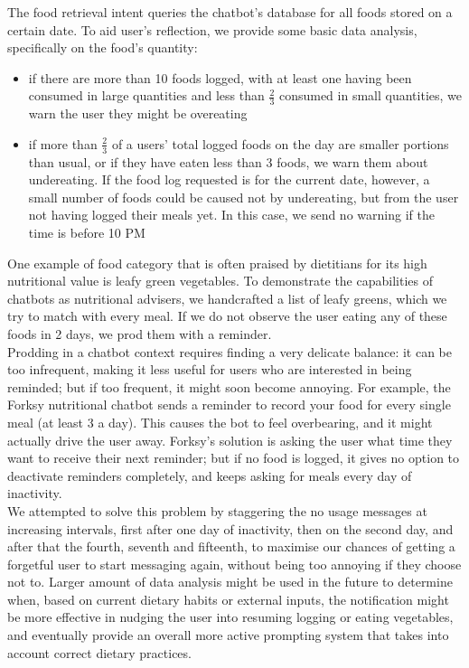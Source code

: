 The food retrieval intent queries the chatbot's database for all foods stored on a certain date. To aid user's reflection, we provide some basic data analysis, specifically on the food's quantity: 
\begin{itemize}
\item if there are more than 10 foods logged, with at least one having been consumed in large quantities and less than $\frac{2}{3}$ consumed in small quantities, we warn the user they might be overeating
\item if more than $\frac{2}{3}$ of a users' total logged foods on the day are smaller portions than usual, or if they have eaten less than 3 foods, we warn them about undereating. If the food log requested is for the current date, however, a small number of foods could be caused not by undereating, but from the user not having logged their meals yet. In this case, we send no warning if the time is before 10 PM
\end{itemize}

One example of food category that is often praised by dietitians for its high nutritional value \cite{bishoppgreens} is leafy green vegetables. To demonstrate the capabilities of chatbots as nutritional advisers, we handcrafted a list of leafy greens, which we try to match with every meal. If we do not observe the user eating any of these foods in 2 days, we prod them with a reminder. \\
Prodding in a chatbot context requires finding a very delicate balance: it can be too infrequent, making it less useful for users who are interested in being reminded; but if too frequent, it  might soon become annoying. For example, the Forksy nutritional chatbot \cite{forksywebsite} sends a reminder to record your food for every single meal (at least 3 a day). This causes the bot to feel overbearing, and it might actually drive the user away. Forksy's solution is asking the user what time they want to receive their next reminder; but if no food is logged, it gives no option to deactivate reminders completely, and keeps asking for meals every day of inactivity. \\
We attempted to solve this problem by staggering the no usage messages at increasing intervals, first after one day of inactivity, then on the second day, and after that the fourth, seventh and fifteenth, to maximise our chances of getting a forgetful user to start messaging again, without being too annoying if they choose not to. Larger amount of data analysis might be used in the future to determine when, based on current dietary habits or external inputs, the notification might be more effective in nudging the user into resuming logging or eating vegetables, and eventually provide an overall more active prompting system that takes into account correct dietary practices.

